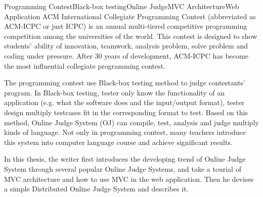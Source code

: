 
\begin{Eabstract}{Programming Contest}{Black-box testing}{Online Judge}{MVC Architecture}{Web Application}
ACM International Collegiate Programming Contest (abbreviated as ACM-ICPC or just ICPC) is an annual multi-tiered competitive programming competition among the universities of the world. This contest is designed to show students' ability of innovation, teamwork, analysis problem, solve problem and coding under pressure. After 30 years of development, ACM-ICPC has become the most influential collegiate programming contest. 

The programming contest use Black-box testing method to judge contestants' program. In Black-box testing, tester only know the functionality of an application (e.g. what the software does and the input/output format), tester design multiply testcases fit in the corresponding format to test. Based on this method, Online Judge System (OJ) can compile, test, analysis and judge multiply kinds of language. Not only in programming contest, many teachers introduce this system into computer language course and achieve significant results.

In this thesis, the writer first introduces the developing trend of Online Judge System through several popular Online Judge Systems, and take a tourial of MVC architecture and how to use MVC in the web application. Then he devises a simple Distributed Online Judge System and describes it.
\end{Eabstract}
